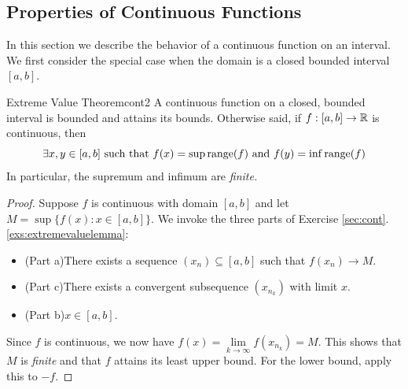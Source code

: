 

\goodbreak



\subsection{Properties of Continuous Functions}\label{sec:propcont}


In this section we describe the behavior of a continuous function on an interval. We first consider the special case when the domain is a closed bounded interval $[a,b]$.




\begin{thm}{Extreme Value Theorem}{cont2}
	A continuous function on a closed, bounded interval is bounded and attains its bounds. Otherwise said, if $f:[a,b]\to\mathbb{R}$ is continuous, then
	\[
		\exists x,y\in [a,b]\text{ such that }f(x)=\sup\operatorname{range}(f)\ \text{and}\  f(y)=\inf\operatorname{range}(f)
	\]
	In particular, the supremum and infimum are \emph{finite.}
\end{thm}


\begin{proof}
	Suppose $f$ is continuous with domain $[a,b]$ and let $M=\sup\{f(x):x\in[a,b]\}$. We invoke the three parts of Exercise \ref*{sec:cont}.\ref{exs:extremevaluelemma}:
	\begin{itemize}\itemsep2pt
	  \item (Part a)\lstsp There exists a sequence $(x_n)\subseteq [a,b]$ such that $f(x_n)\to M$.
	  \item (Part c)\lstsp There exists a convergent subsequence $(x_{n_k})$ with limit $x$.
	  \item (Part b)\lstsp $x\in [a,b]$.
	\end{itemize}
	Since $f$ is continuous, we now have $f(x)=\lim\limits_{k\to\infty}f(x_{n_k})=M$. This shows that $M$ is \emph{finite} and that $f$ attains its least upper bound.
	For the lower bound, apply this to $-f$.
\end{proof}
	
